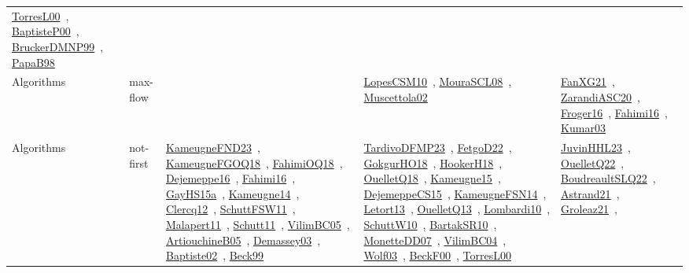 {\begin{longtable}{lp{3cm}>{\raggedright\arraybackslash}p{6cm}>{\raggedright\arraybackslash}p{6cm}>{\raggedright\arraybackslash}p{8cm}}
\href{works/TorresL00.pdf}{TorresL00}~\cite{TorresL00}, \href{works/BaptisteP00.pdf}{BaptisteP00}~\cite{BaptisteP00}, \href{works/BruckerDMNP99.pdf}{BruckerDMNP99}~\cite{BruckerDMNP99}, \href{works/PapaB98.pdf}{PapaB98}~\cite{PapaB98}\\
Algorithms & max-flow &  & \href{works/LopesCSM10.pdf}{LopesCSM10}~\cite{LopesCSM10}, \href{works/MouraSCL08.pdf}{MouraSCL08}~\cite{MouraSCL08}, \href{works/Muscettola02.pdf}{Muscettola02}~\cite{Muscettola02} & \href{works/FanXG21.pdf}{FanXG21}~\cite{FanXG21}, \href{works/ZarandiASC20.pdf}{ZarandiASC20}~\cite{ZarandiASC20}, \href{works/Froger16.pdf}{Froger16}~\cite{Froger16}, \href{works/Fahimi16.pdf}{Fahimi16}~\cite{Fahimi16}, \href{works/Kumar03.pdf}{Kumar03}~\cite{Kumar03}\\
Algorithms & not-first & \href{works/KameugneFND23.pdf}{KameugneFND23}~\cite{KameugneFND23}, \href{works/KameugneFGOQ18.pdf}{KameugneFGOQ18}~\cite{KameugneFGOQ18}, \href{works/FahimiOQ18.pdf}{FahimiOQ18}~\cite{FahimiOQ18}, \href{works/Dejemeppe16.pdf}{Dejemeppe16}~\cite{Dejemeppe16}, \href{works/Fahimi16.pdf}{Fahimi16}~\cite{Fahimi16}, \href{works/GayHS15a.pdf}{GayHS15a}~\cite{GayHS15a}, \href{works/Kameugne14.pdf}{Kameugne14}~\cite{Kameugne14}, \href{works/Clercq12.pdf}{Clercq12}~\cite{Clercq12}, \href{works/SchuttFSW11.pdf}{SchuttFSW11}~\cite{SchuttFSW11}, \href{works/Malapert11.pdf}{Malapert11}~\cite{Malapert11}, \href{works/Schutt11.pdf}{Schutt11}~\cite{Schutt11}, \href{works/VilimBC05.pdf}{VilimBC05}~\cite{VilimBC05}, \href{works/ArtiouchineB05.pdf}{ArtiouchineB05}~\cite{ArtiouchineB05}, \href{works/Demassey03.pdf}{Demassey03}~\cite{Demassey03}, \href{works/Baptiste02.pdf}{Baptiste02}~\cite{Baptiste02}, \href{works/Beck99.pdf}{Beck99}~\cite{Beck99} & \href{works/TardivoDFMP23.pdf}{TardivoDFMP23}~\cite{TardivoDFMP23}, \href{works/FetgoD22.pdf}{FetgoD22}~\cite{FetgoD22}, \href{works/GokgurHO18.pdf}{GokgurHO18}~\cite{GokgurHO18}, \href{works/HookerH18.pdf}{HookerH18}~\cite{HookerH18}, \href{works/OuelletQ18.pdf}{OuelletQ18}~\cite{OuelletQ18}, \href{works/Kameugne15.pdf}{Kameugne15}~\cite{Kameugne15}, \href{works/DejemeppeCS15.pdf}{DejemeppeCS15}~\cite{DejemeppeCS15}, \href{works/KameugneFSN14.pdf}{KameugneFSN14}~\cite{KameugneFSN14}, \href{works/Letort13.pdf}{Letort13}~\cite{Letort13}, \href{works/OuelletQ13.pdf}{OuelletQ13}~\cite{OuelletQ13}, \href{works/Lombardi10.pdf}{Lombardi10}~\cite{Lombardi10}, \href{works/SchuttW10.pdf}{SchuttW10}~\cite{SchuttW10}, \href{works/BartakSR10.pdf}{BartakSR10}~\cite{BartakSR10}, \href{works/MonetteDD07.pdf}{MonetteDD07}~\cite{MonetteDD07}, \href{works/VilimBC04.pdf}{VilimBC04}~\cite{VilimBC04}, \href{works/Wolf03.pdf}{Wolf03}~\cite{Wolf03}, \href{works/BeckF00.pdf}{BeckF00}~\cite{BeckF00}, \href{works/TorresL00.pdf}{TorresL00}~\cite{TorresL00} & \href{works/JuvinHHL23.pdf}{JuvinHHL23}~\cite{JuvinHHL23}, \href{works/OuelletQ22.pdf}{OuelletQ22}~\cite{OuelletQ22}, \href{works/BoudreaultSLQ22.pdf}{BoudreaultSLQ22}~\cite{BoudreaultSLQ22}, \href{works/Astrand21.pdf}{Astrand21}~\cite{Astrand21}, \href{works/Groleaz21.pdf}{Groleaz21}~\cite{Groleaz21}, 
\end{longtable}}
